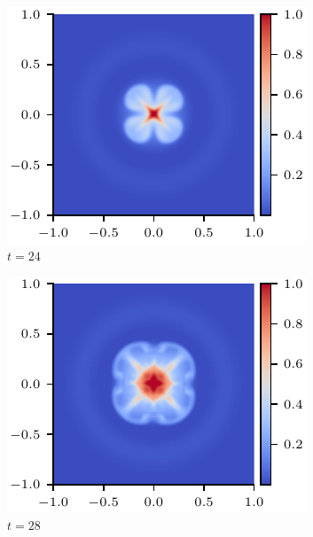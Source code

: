 \begin{figure}[t]
  \centering
    \begin{subfigure}{0.32\textwidth}
      \includegraphics[width=\linewidth]{swi-3_pressure_12.pdf}
      \caption{$t=24$}
      \label{fig:swi-3_pressure_12}
    \end{subfigure}
    \hfill
    \begin{subfigure}{0.32\textwidth}
      \includegraphics[width=\linewidth]{swi-3_pressure_14.pdf}
      \caption{$t=28$}
      \label{fig:swi-3_pressure_14}
    \end{subfigure}
    \hfill
    \begin{subfigure}{0.32\textwidth}

\end{subfigure}
\end{figure}
